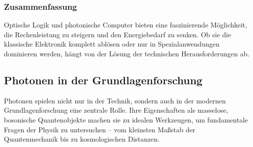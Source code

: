 \subsubsection{Zusammenfassung}

Optische Logik und photonische Computer bieten eine faszinierende Möglichkeit, die Rechenleistung zu steigern und den Energiebedarf zu senken. Ob sie die klassische Elektronik komplett ablösen oder nur in Spezialanwendungen dominieren werden, hängt von der Lösung der technischen Herausforderungen ab.
\newpage
\noindent
\subsection{Photonen in der Grundlagenforschung}

Photonen spielen nicht nur in der Technik, sondern auch in der modernen Grundlagenforschung eine zentrale Rolle. 
Ihre Eigenschaften als masselose, bosonische Quantenobjekte machen sie zu idealen Werkzeugen, um fundamentale Fragen der Physik zu untersuchen – vom kleinsten Maßstab der Quantenmechanik bis zu kosmologischen Distanzen.

